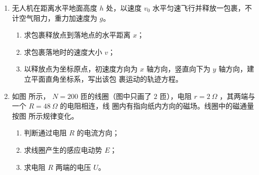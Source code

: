 \begin{enumerate}
\item
无人机在距离水平地面高度 $ h $ 处，以速度 $ v_{0} $ 水平匀速飞行并释放一包裹，不计空气阻力，重力加速度为 $ g $。
\begin{enumerate}
\item
求包裹释放点到落地点的水平距离 $ x $；
\item 
求包裹落地时的速度大小 $ v $；
\item 
以释放点为坐标原点，初速度方向为 $ x $ 轴方向，竖直向下为 $ y $ 轴方向，建立平面直角坐标系，写出该包
裹运动的轨迹方程。
\end{enumerate}






\vfill

\item
如图  所示， $ N =200 $ 匝的线圈（图中只画了 $ 2 $ 匝），电阻 $ r=2 \ \Omega $ ，其两端与一个 $ R = 48 \ \Omega $ 的电阻相连，线
圈内有指向纸内方向的磁场。线圈中的磁通量按图  所示规律变化。
\begin{enumerate}
\item
判断通过电阻 $ R $ 的电流方向；
\item 
求线圈产生的感应电动势 $ E $；
\item 
求电阻 $ R $ 两端的电压 $ U $。
\end{enumerate}
\begin{figure}[h!]
\flushright
\begin{subfigure}{0.3\linewidth}
\centering
 
\caption{}\label{2020:北京18:a}
\end{subfigure}
\begin{subfigure}{0.3\linewidth}
\centering
 
\caption{}\label{2020:北京18:b}
\end{subfigure}
\end{figure}



\end{enumerate}
